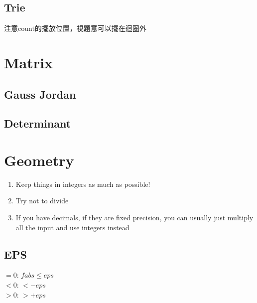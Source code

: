 \documentclass[10pt,oneside]{article}
\begin{document}
\begin{landscape}
\begin{multicols}{2}

\subsection{Trie}
注意count的擺放位置，視題意可以擺在迴圈外

\section{Matrix}

\subsection{Gauss Jordan}

\subsection{Determinant}



\section{Geometry}

\begin{enumerate}
	\item Keep things in integers as much as possible!
	\item Try not to divide
	\item If you have decimals, if they are fixed precision, you can usually just multiply all the input and use integers instead
\end{enumerate}

\subsection{EPS}


$=0$: $fabs \leq eps$\\
$<0$: $ < -eps$\\
$>0$: $ > +eps$


\end{multicols}
\end{landscape}
\end{document}

